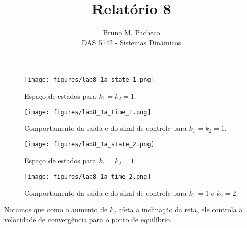 \documentclass[a4paper]{report}
\begin{document}
\title{Relatório 8}
\author{Bruno M. Pacheco\\
DAS 5142 - Sistemas Dinâmicos}
 
\maketitle



\begin{figure}[H]
    \centering
    \texttt{[image: figures/lab8\_1a\_state\_1.png]}
    \caption{Espaço de estados para $k_1 = k_2 = 1$.}
    \label{fig:figures-lab8_1a_state-png}
\end{figure}

\begin{figure}[H]
    \centering
    \texttt{[image: figures/lab8\_1a\_time\_1.png]}
    \caption{Comportamento da saída e do sinal de controle para $k_1 = k_2 = 1$.}
    \label{fig:figures-lab8_1a_state-png}
\end{figure}

\begin{figure}[H]
    \centering
    \texttt{[image: figures/lab8\_1a\_state\_2.png]}
    \caption{Espaço de estados para $k_1 = k_2 = 1$.}
    \label{fig:figures-lab8_1a_state-png}
\end{figure}

\begin{figure}[H]
    \centering
    \texttt{[image: figures/lab8\_1a\_time\_2.png]}
    \caption{Comportamento da saída e do sinal de controle para $k_1 = 1$ e $k_2 = 2$.}
    \label{fig:figures-lab8_1a_state-png}
\end{figure}

Notamos que como o aumento de $k_2$ afeta a inclinação da reta, ele controla a velocidade de convergência para o ponto de equilíbrio.


\end{document}
